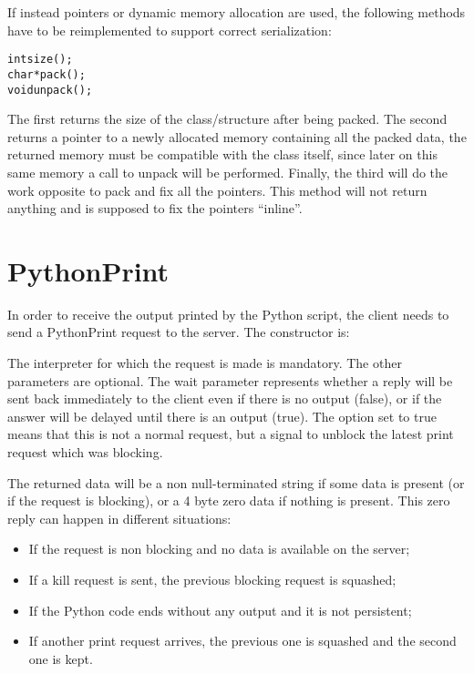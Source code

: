 If instead pointers or dynamic memory allocation are used, the following methods
have to be reimplemented to support correct serialization:

\begin{alltt}
int size();
char * pack();
void unpack();
\end{alltt}

The first returns the size of the class/structure after being packed. The second
returns a pointer to a newly allocated memory containing all the packed data,
the returned memory must be compatible with the class itself, since later on
this same memory a call to unpack will be performed. Finally, the third will do
the work opposite to pack and fix all the pointers. This method will not return
anything and is supposed to fix the pointers ``inline''.

\section{PythonPrint}
\label{pythonPrint}

In order to receive the output printed by the Python script, the client needs to
send a PythonPrint request to the server. The constructor is:


The interpreter for which the request is made is mandatory. The other parameters
are optional. The wait parameter represents whether a reply will be sent back
immediately to the client even if there is no output (false), or if the answer
will be delayed until there is an output (true). The  option set to
true means that this is not a normal request, but a signal to unblock the latest
print request which was blocking.

The returned data will be a non null-terminated string if some data is present
(or if the request is blocking), or a 4 byte zero data if nothing is present.
This zero reply can happen in different situations:

\begin{itemize}
\item If the request is non blocking and no data is available on the server;
\item If a kill request is sent, the previous blocking request is squashed;
\item If the Python code ends without any output and it is not persistent;
\item If another print request arrives, the previous one is squashed and the second one is kept.
\end{itemize}

